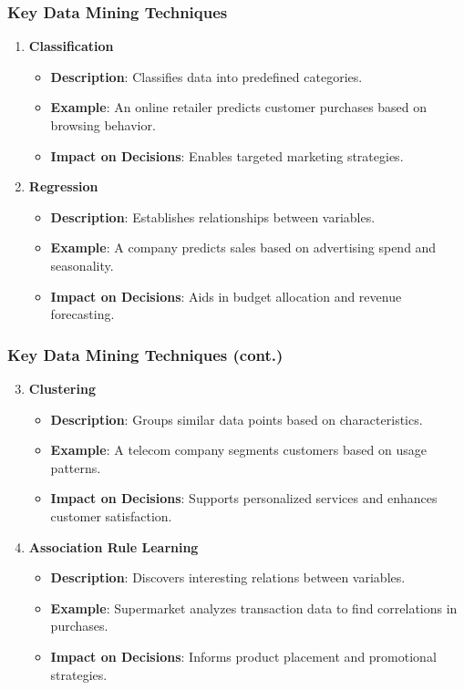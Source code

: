 \documentclass[aspectratio=169]{beamer}
\begin{document}
\begin{frame}[fragile]
    \frametitle{Key Data Mining Techniques}
    \begin{enumerate}
        \item \textbf{Classification}
            \begin{itemize}
                \item \textbf{Description}: Classifies data into predefined categories.
                \item \textbf{Example}: An online retailer predicts customer purchases based on browsing behavior.
                \item \textbf{Impact on Decisions}: Enables targeted marketing strategies.
            \end{itemize}
        \item \textbf{Regression}
            \begin{itemize}
                \item \textbf{Description}: Establishes relationships between variables.
                \item \textbf{Example}: A company predicts sales based on advertising spend and seasonality.
                \item \textbf{Impact on Decisions}: Aids in budget allocation and revenue forecasting.
            \end{itemize}
    \end{enumerate}
\end{frame}

\begin{frame}[fragile]
    \frametitle{Key Data Mining Techniques (cont.)}
    \begin{enumerate}
        \setcounter{enumi}{2} %
        \item \textbf{Clustering}
            \begin{itemize}
                \item \textbf{Description}: Groups similar data points based on characteristics.
                \item \textbf{Example}: A telecom company segments customers based on usage patterns.
                \item \textbf{Impact on Decisions}: Supports personalized services and enhances customer satisfaction.
            \end{itemize}
        \item \textbf{Association Rule Learning}
            \begin{itemize}
                \item \textbf{Description}: Discovers interesting relations between variables.
                \item \textbf{Example}: Supermarket analyzes transaction data to find correlations in purchases.
                \item \textbf{Impact on Decisions}: Informs product placement and promotional strategies.
            \end{itemize}
    \end{enumerate}
\end{frame}
\end{document}
